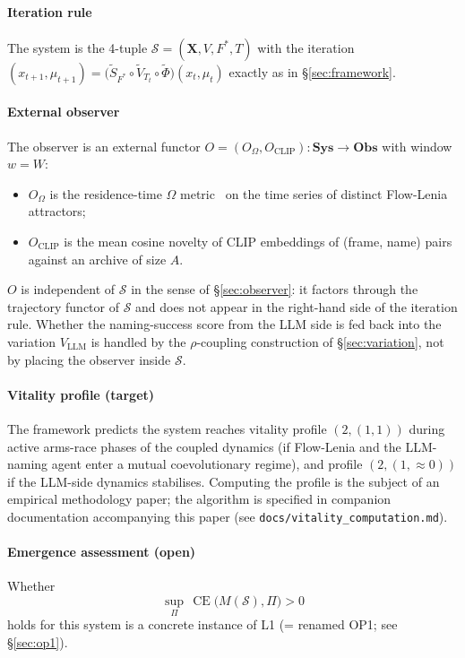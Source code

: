 \documentclass[journal]{IEEEtran}
\theoremstyle{plain}
\theoremstyle{definition}
\theoremstyle{plain}
\DeclareMathOperator{\CE}{CE}
\newcommand{\X}{\mathbf{X}}
\begin{document}
\paragraph{Iteration rule}
The system is the 4-tuple $\mathcal{S} = (\X, V, F^\ast, T)$ with the
iteration
$(x_{t+1},\mu_{t+1}) =
  \big(\widetilde S_{F^{*}} \circ
        \widetilde V_{T_{t}} \circ
        \widetilde\Phi\big)(x_{t},\mu_{t})$
exactly as in \S\ref{sec:framework}.

\paragraph{External observer}
The observer is an external functor
$O = (O_\Omega, O_{\mathrm{CLIP}}) : \mathbf{Sys} \to \mathbf{Obs}$
with window $w = W$:
\begin{itemize}[leftmargin=1.5em,itemsep=2pt]
  \item $O_\Omega$ is the residence-time $\Omega$
        metric~\cite{lopezdiaz2025undecidability} on the time series of
        distinct Flow-Lenia attractors;
  \item $O_{\mathrm{CLIP}}$ is the mean cosine novelty of CLIP
        embeddings of (frame, name) pairs against an archive of size
        $A$.
\end{itemize}
$O$ is independent of $\mathcal{S}$ in the sense of \S\ref{sec:observer}:
it factors through the trajectory functor of $\mathcal{S}$ and does not
appear in the right-hand side of the iteration rule. Whether the
naming-success score from the LLM side is fed back into the variation
$V_{\mathrm{LLM}}$ is handled by the $\rho$-coupling
construction of \S\ref{sec:variation}, not by
placing the observer inside $\mathcal{S}$.

\paragraph{Vitality profile (target)}
The framework predicts the system reaches vitality profile
$(2, (1, 1))$ during active arms-race phases of the coupled dynamics
(if Flow-Lenia and the LLM-naming agent enter a mutual coevolutionary
regime), and profile $(2, (1, \approx 0))$ if the LLM-side dynamics
stabilises. Computing the profile is the subject of an empirical
methodology paper; the algorithm is specified in companion
documentation accompanying this paper (see
\texttt{docs/vitality\_computation.md}).

\paragraph{Emergence assessment (open)}
Whether
\[
  \sup_{\Pi}\,\CE\bigl(M(\mathcal{S}),\Pi\bigr) > 0
\]
holds for this system is a concrete instance of L1 (= renamed OP1; see
\S\ref{sec:op1}).
\end{document}
